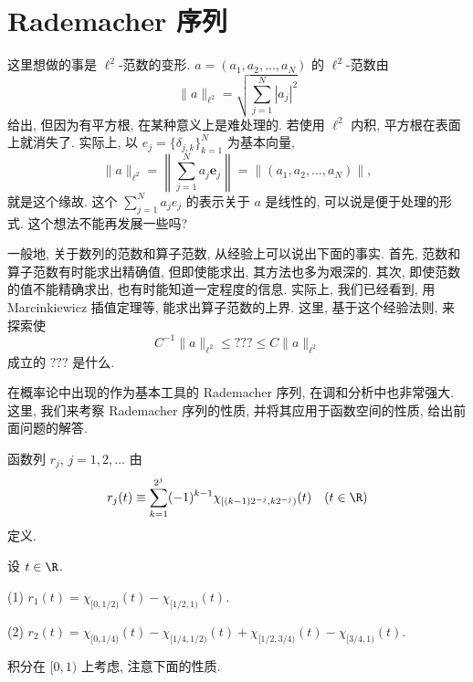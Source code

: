\section{Rademacher 序列}\label{sec:1.5}










这里想做的事是 $\ell^{2}$-范数的变形. $a = (a_{1}, a_{2}, \ldots, a_{N})$ 的 $\ell^{2}$-范数由
\[
\| a \|_{\ell^{2}} = \sqrt{\sum_{j=1}^{N} |a_{j}|^{2}}
\]
给出, 但因为有平方根, 在某种意义上是难处理的. 若使用 $\ell^{2}$ 内积, 平方根在表面上就消失了. 实际上, 以 $e_{j} = \{\delta_{j,k}\}_{k=1}^{N}$ 为基本向量,
\[
\| a \|_{\ell^{2}} = \left\| \sum_{j=1}^{N} a_{j}\mathbf{e}_{j} \right\| = \| (a_{1}, a_{2}, \ldots, a_{N}) \|,
\]
就是这个缘故. 这个 $\sum_{j=1}^{N} a_{j}e_{j}$ 的表示关于 $a$ 是线性的, 可以说是便于处理的形式. 这个想法不能再发展一些吗?

一般地, 关于数列的范数和算子范数, 从经验上可以说出下面的事实. 首先, 范数和算子范数有时能求出精确值, 但即使能求出, 其方法也多为艰深的. 其次, 即使范数的值不能精确求出, 也有时能知道一定程度的信息. 实际上, 我们已经看到, 用 Marcinkiewicz 插值定理等, 能求出算子范数的上界. 这里, 基于这个经验法则, 来探索使
\[
C^{-1}\| a \|_{\ell^{2}} \leq ??? \leq C\| a \|_{\ell^{2}}
\]
成立的 $???$ 是什么.

在概率论中出现的作为基本工具的 Rademacher 序列, 在调和分析中也非常强大. 这里, 我们来考察 Rademacher 序列的性质, 并将其应用于函数空间的性质, 给出前面问题的解答.

\begin{definition}[Rademacher 序列]\label{def:1.3}
函数列 $r_{j}$, $j = 1, 2, \ldots$ 由
\[
r_{j}(t) \equiv \sum_{k=1}^{2^{j}} (-1)^{k-1}\chi_{[(k-1)2^{-j}, k2^{-j})}(t) \quad (t \in \R)
\]
定义.
\end{definition}

\begin{example}\label{exa:1.11}
设 $t \in \R$.

(1) $r_{1}(t) = \chi_{[0,1/2)}(t) - \chi_{[1/2,1)}(t)$.

(2) $r_{2}(t) = \chi_{[0,1/4)}(t) - \chi_{[1/4,1/2)}(t) + \chi_{[1/2,3/4)}(t) - \chi_{[3/4,1)}(t)$.
\end{example}

积分在 $[0, 1)$ 上考虑, 注意下面的性质.


